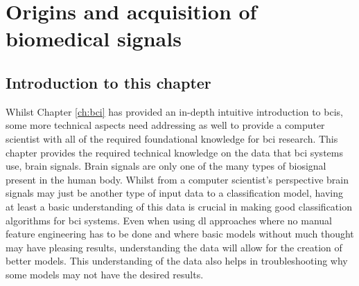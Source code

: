 




\glsresetall

\chapter{Origins and acquisition of biomedical signals}
\label{ch:biomedical_signals}

\section{Introduction to this chapter}
\label{sec:biomedical_signals_introduction}

Whilst Chapter \ref{ch:bci} has provided an in-depth intuitive introduction to \glspl{bci}, some more technical aspects need addressing as well to provide a computer scientist with all of the required foundational knowledge for \gls{bci} research.
This chapter provides the required technical knowledge on the data that \gls{bci} systems use, brain signals.
Brain signals are only one of the many types of \gls{biosignal} present in the human body.
Whilst from a computer scientist's perspective brain signals may just be another type of input data to a classification model, having at least a basic understanding of this data is crucial in making good classification algorithms for \gls{bci} systems.
Even when using \gls{dl} approaches where no manual feature engineering has to be done and where basic models without much thought may have pleasing results, understanding the data will allow for the creation of better models.
This understanding of the data also helps in troubleshooting why some models may not have the desired results.

